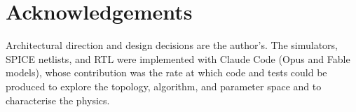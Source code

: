 \documentclass[11pt]{article}
\begin{document}
\hypertarget{acknowledgements}{%
\section*{Acknowledgements}\label{acknowledgements}}

Architectural direction and design decisions are the author's. The
simulators, SPICE netlists, and RTL were implemented with Claude Code
\cite{anthropic2025claudecode} (Opus and Fable models), whose
contribution was the rate at which code and tests could be produced to
explore the topology, algorithm, and parameter space and to characterise
the physics.




\end{document}
